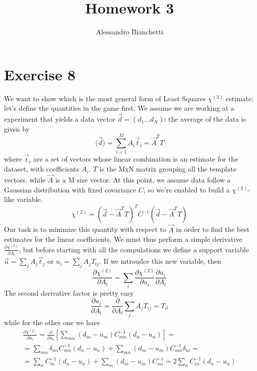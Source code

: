 \documentclass[a4paper,11pt,fleqn]{article}
\title{Homework 3}
\author{Alessandro Bianchetti}
\begin{document}
\maketitle

\section{Exercise 8}
We want to show which is the most general form of Least Squares $\chi^{(2)}$
estimate: let's define the quantities in the game first. We assume we are 
working at a experiment that yields a data vector $\vec{d}=(d_1 \dotsc d_N)$: 
the average of the data is given by 
\begin{equation}
    \langle \vec{d} \rangle = \sum_{i=1}^M A_i \vec{t}_i = \vec{A}^TT    
\end{equation}
where $\vec{t}_i$ are a set of vectors whose linear combination is an 
estimate for the dataset, with coefficients $A_i$. $T$ is the MxN matrix 
grouping all the template vectors, while $\vec{A}$ is a M size vector. 
At this point, we assume data follow a Gaussian distribution with fixed 
covariance $C$, so we're enabled to build a $\chi^{(2)}$-like variable.
\begin{equation}
    \chi^{(2)}=(\vec{d}-\vec{A}^TT)^T C^{-1}(\vec{d}-\vec{A}^TT)
\end{equation} 
Our task is to minimize this quantity with respect to $\vec{A}$ in order to 
find the best estimates for the linear coefficients. We must thus perform 
a simple derivative $\frac{\partial \chi^{(2)}}{\partial A_l}$, but before 
starting with all the compulations we define a support variable 
$\vec{u} = \sum_jA_j\vec{t}_j$ or $u_i = \sum_j A_j T_{ij}$. If we 
introudce this new variable, then 
\begin{equation}
    \label{eqn:der}
    \frac{\partial \chi^{(2)}}{\partial A_l} = \sum_i \frac{\partial \chi^{(2)}}{\partial u_i}\frac{\partial u_i}{\partial A_l}
\end{equation}
The second derivative factor is pretty easy
\begin{equation*}
    \frac{\partial u_i}{\partial A_l} = \frac{\partial }{\partial A_l} \sum_j A_j T_{ij} = T_{il} 
\end{equation*}
while for the other one we have 
\begin{gather*}
    \frac{\partial \chi^{(2)}}{\partial u_i} = \frac{\partial}{\partial u_i}\left[\sum_{mn}(d_m-u_m)C^{-1}_{mn}(d_n-u_n)\right] = \\ 
    = \sum_{mn}\delta_{mi}C^{-1}_{mn}(d_n-u_n) + \sum_{mn}(d_m-u_m)C^{-1}_{mn}\delta_{ni} = \\ 
    = \sum_{n}C^{-1}_{in}(d_n-u_n) + \sum_{m}(d_m-u_m)C^{-1}_{mi} = 2\sum_n C^{-1}_{in}(d_n-u_n) 
\end{gather*}
\end{document}
